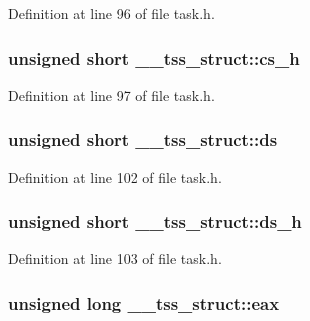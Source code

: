 Definition at line 96 of file task.\+h.

\subsubsection[{\texorpdfstring{cs\+\_\+h}{cs_h}}]{\setlength{\rightskip}{0pt plus 5cm}unsigned short \+\_\+\+\_\+tss\+\_\+struct\+::cs\+\_\+h}\hypertarget{struct____tss__struct_a20fd7d98f390bda555de791fff0d6fda}{}\label{struct____tss__struct_a20fd7d98f390bda555de791fff0d6fda}


Definition at line 97 of file task.\+h.

\subsubsection[{\texorpdfstring{ds}{ds}}]{\setlength{\rightskip}{0pt plus 5cm}unsigned short \+\_\+\+\_\+tss\+\_\+struct\+::ds}\hypertarget{struct____tss__struct_a7d135efa48729e8d72c58f68395d0a23}{}\label{struct____tss__struct_a7d135efa48729e8d72c58f68395d0a23}


Definition at line 102 of file task.\+h.

\subsubsection[{\texorpdfstring{ds\+\_\+h}{ds_h}}]{\setlength{\rightskip}{0pt plus 5cm}unsigned short \+\_\+\+\_\+tss\+\_\+struct\+::ds\+\_\+h}\hypertarget{struct____tss__struct_a21e478f52a03d836cc45af1a49f4d876}{}\label{struct____tss__struct_a21e478f52a03d836cc45af1a49f4d876}


Definition at line 103 of file task.\+h.

\subsubsection[{\texorpdfstring{eax}{eax}}]{\setlength{\rightskip}{0pt plus 5cm}unsigned long \+\_\+\+\_\+tss\+\_\+struct\+::eax}\hypertarget{struct____tss__struct_aa70f529f7adea9e30313ef9fcd0191da}{}\label{struct____tss__struct_aa70f529f7adea9e30313ef9fcd0191da}


